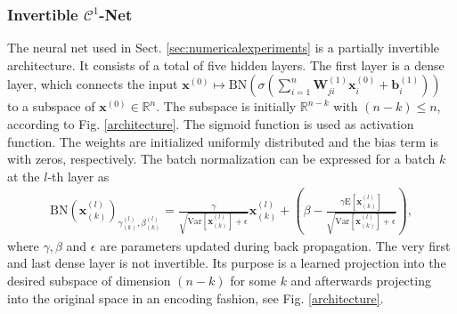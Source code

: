 \documentclass[envcountsect,runningheads]{llncs}
\begin{document}
\subsubsection{Invertible $\mathcal{C}^1$-Net}
\label{appx:invarch}
The neural net used in Sect. \ref{sec:numericalexperiments} is a partially invertible architecture. It consists of a total of five hidden layers. The first layer is a dense layer, which connects the input $\mathbf{x}^{(0)} \mapsto \text{BN}\left(\sigma\left(\sum_{i=1}^{n} \textbf{W}^{(1)}_{ji}\mathbf{x}^{(0)}_{i} + \mathbf{b}^{(1)}_{i}\right)\right)$ to a subspace of $\mathbf{x}^{(0)} \in \mathbb{R}^n$. The subspace is initially $\mathbb{R}^{n-k}$ with $(n-k) \leq n$, according to Fig. \ref{architecture}. The sigmoid function is used as activation function. The weights are initialized uniformly distributed and the bias term is with zeros, respectively. The batch normalization can be expressed for a batch $k$ at the $l$-th layer as
\begin{align}
	\text{BN}(\mathbf{x}^{(l)}_{(k)})_{\gamma^{(l)}_{(k)},\beta^{(l)}_{(k)}} = \frac{\gamma}{\sqrt{\text{Var}[\mathbf{x}^{(l)}_{(k)}] + \epsilon}} \mathbf{x}^{(l)}_{(k)} + \left( \beta - \frac{\gamma \text{E}[\mathbf{x}^{(l)}_{(k)}]}{\sqrt{\text{Var}[\mathbf{x}^{(l)}_{(k)}]+\epsilon}} \right),
\end{align}
where $\gamma,\beta$ and $\epsilon$ are parameters updated during back propagation. The very first and last dense layer is not invertible. Its purpose is a learned projection into the desired subspace of dimension $(n-k)$ for some $k$ and afterwards projecting into the original space in an encoding fashion, see Fig. \ref{architecture}.
\end{document}
